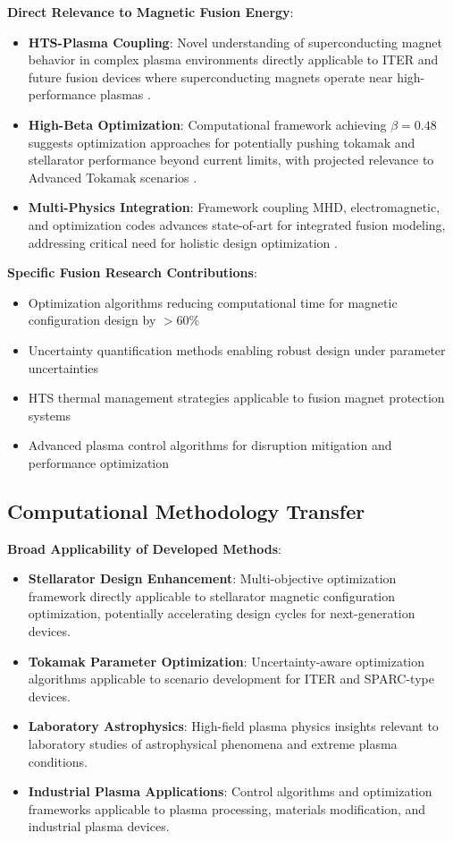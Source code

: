 \documentclass[12pt,a4paper]{article}
\begin{document}
\textbf{Direct Relevance to Magnetic Fusion Energy}:
\begin{itemize}
\item \textbf{HTS-Plasma Coupling}: Novel understanding of superconducting magnet behavior in complex plasma environments directly applicable to ITER and future fusion devices where superconducting magnets operate near high-performance plasmas \cite{HTS2024,MagneticConfinement2021}.
\item \textbf{High-Beta Optimization}: Computational framework achieving $\beta = 0.48$ suggests optimization approaches for potentially pushing tokamak and stellarator performance beyond current limits, with projected relevance to Advanced Tokamak scenarios \cite{Plasma2023}.
\item \textbf{Multi-Physics Integration}: Framework coupling MHD, electromagnetic, and optimization codes advances state-of-art for integrated fusion modeling, addressing critical need for holistic design optimization \cite{PlasmaPhysics2023}.
\end{itemize}

\textbf{Specific Fusion Research Contributions}:
\begin{itemize}
\item Optimization algorithms reducing computational time for magnetic configuration design by $>60\%$
\item Uncertainty quantification methods enabling robust design under parameter uncertainties
\item HTS thermal management strategies applicable to fusion magnet protection systems
\item Advanced plasma control algorithms for disruption mitigation and performance optimization
\end{itemize}

\subsection{Computational Methodology Transfer}

\textbf{Broad Applicability of Developed Methods}:
\begin{itemize}
\item \textbf{Stellarator Design Enhancement}: Multi-objective optimization framework directly applicable to stellarator magnetic configuration optimization, potentially accelerating design cycles for next-generation devices.
\item \textbf{Tokamak Parameter Optimization}: Uncertainty-aware optimization algorithms applicable to scenario development for ITER and SPARC-type devices.
\item \textbf{Laboratory Astrophysics}: High-field plasma physics insights relevant to laboratory studies of astrophysical phenomena and extreme plasma conditions.
\item \textbf{Industrial Plasma Applications}: Control algorithms and optimization frameworks applicable to plasma processing, materials modification, and industrial plasma devices.
\end{itemize}
\end{document}

